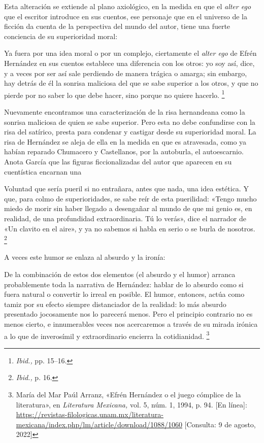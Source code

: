 \documentclass[14pt,twoside,final]{extbook} %
\let\oldfootnote\footnote
\renewcommand\footnote[1]{%
\oldfootnote{\hspace{1mm}#1}}
\begin{document}
Esta alteración se extiende al plano axiológico, en la medida en que el \emph{alter ego} que el escritor introduce en sus cuentos, ese personaje que en el universo de la ficción da cuenta de la perspectiva del mundo del autor, tiene una fuerte conciencia de su superioridad moral:
\begin{quoting}
Ya fuera por una idea moral o por un complejo, ciertamente el \emph{alter ego} de Efrén Hernández en sus cuentos establece una diferencia con los otros: yo soy así, dice, y a veces por ser así sale perdiendo de manera trágica o amarga; sin embargo, hay detrás de él la sonrisa maliciosa del que se sabe superior a los otros, y que no pierde por no saber lo que debe hacer, sino porque no quiere hacerlo.\footnote{\emph{Ibid.,} pp. 15--16.}
\end{quoting}
Nuevamente encontramos una caracterización de la risa hernandeana como la sonrisa maliciosa de quien se sabe superior. Pero esta no debe confundirse con la risa del satírico, presta para condenar y castigar desde su superioridad moral. La risa de Hernández se aleja de ella en la medida en que es atravesada, como ya habían reparado Chumacero y Castellanos, por la autoburla, el autoescarnio. Anota García que las figuras ficcionalizadas del autor que aparecen en su cuentística encarnan una
\begin{quoting}
Voluntad que sería pueril si no entrañara, antes que nada, una idea estética. Y que, para colmo de superioridades, se sabe reír de esta puerilidad: «Tengo mucho miedo de morir sin haber llegado a desengañar al mundo de que mi genio es, en realidad, de una profundidad extraordinaria. Tú lo verás», dice el narrador de «Un clavito en el aire», y ya no sabemos si habla en serio o se burla de nosotros.\footnote{\emph{Ibid.,} p. 16.}
\end{quoting}
A veces este humor se enlaza al absurdo y la ironía:
\begin{quoting}
De la combinación de estos dos elementos (el absurdo y el humor) arranca probablemente toda la narrativa de Hernández: hablar de lo absurdo como si fuera natural o convertir lo irreal en posible. El humor, entonces, actúa como tamiz por su efecto siempre distanciador de la realidad: lo más absurdo presentado jocosamente nos lo parecerá menos. Pero el principio contrario no es menos cierto, e innumerables veces nos acercaremos a través de su mirada irónica a lo que de inverosímil y extraordinario encierra la cotidianidad.\footnote{María del Mar Paúl Arranz, «Efrén Hernández o el juego cómplice de la literatura», en \emph{Literatura Mexicana,} vol. 5, núm. 1, 1994, p. 94. [En línea]: \url{https://revistas-filologicas.unam.mx/literatura-mexicana/index.php/lm/article/download/1088/1060} [Consulta: 9 de agosto, 2022]}
\end{quoting}
\end{document}
